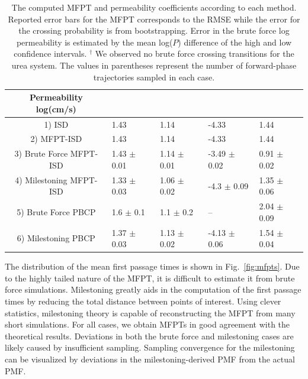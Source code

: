 \begin{table}[htbp]
\begin{sideways}
\begin{tabular}{|c|p{2.25cm}|p{2.25cm}|p{2.25cm}|p{2.25cm}|}
    \textbf{Permeability log(cm/s)} & & & & \\\hline
    1) ISD                  & 1.43            & 1.14             & -4.33            & 1.44           \\\hline
    2) MFPT-ISD             & 1.43            & 1.14             & -4.33            & 1.44           \\\hline
    3) Brute Force MFPT-ISD & 1.43 $\pm$ 0.01 & 1.14 $\pm$ 0.01  & -3.49 $\pm$ 0.02 & 0.91 $\pm$ 0.02\\\hline
    4) Milestoning MFPT-ISD & 1.33 $\pm$ 0.03 & 1.06 $\pm$ 0.02  & -4.3 $\pm$ 0.09  & 1.35 $\pm$ 0.06\\\hline
    5) Brute Force PBCP     & 1.6 $\pm$ 0.1   & 1.1 $\pm$ 0.2    & --               & 2.04 $\pm$ 0.09\\\hline
    6) Milestoning PBCP     & 1.37 $\pm$ 0.03 & 1.13 $\pm$ 0.02  & -4.13 $\pm$ 0.06 & 1.54 $\pm$ 0.04\\\hline
    \end{tabular}
\end{sideways}
\caption{The computed MFPT and permeability coefficients according to each method. Reported error bars for the MFPT corresponds to the RMSE while the error for the crossing probability is from bootstrapping. Error in the brute force log permeability is estimated by the mean log($P$) difference of the high and low confidence intervals. $^{\dagger}$ We observed no brute force crossing transitions for the urea system. The values in parentheses represent the number of forward-phase trajectories sampled in each case.}
\label{table:milepermresults}
\end{table}

    \par The distribution of the mean first passage times is shown in Fig.~\ref{fig:mfpts}. Due to the highly tailed nature of the MFPT, it is difficult to estimate it from brute force simulations. Milestoning greatly aids in the computation of the first passage times by reducing the total distance between points of interest. Using clever statistics, milestoning theory is capable of reconstructing the MFPT from many short simulations. For all cases, we obtain MFPTs in good agreement with the theoretical results. Deviations in both the brute force and milestoning cases are likely caused by insufficient sampling. Sampling convergence for the milestoning can be visualized by deviations in the milestoning-derived PMF from the actual PMF.

